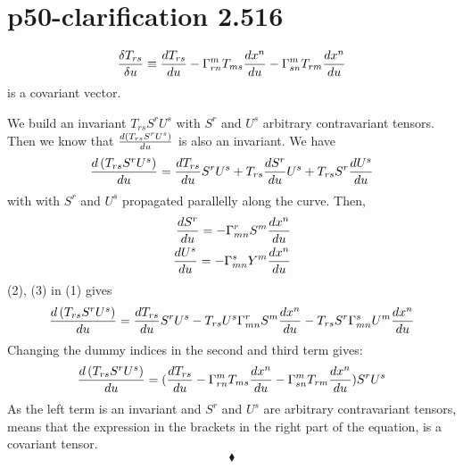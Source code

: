 \section{p50-clarification 2.516}
\begin{tcolorbox}
$$\frac{\delta T_{rs}}{\delta u} \equiv \dv{T_{rs}}{u}  - \Gamma^m_{rn}T_{ms}\dv{x^n}{u} - \Gamma^m_{sn}T_{rm}\dv{x^n}{u}$$ is a covariant vector.
\end{tcolorbox}
We build an invariant $ T_{rs} S^rU^s$ with $S^r$ and $U^s$ arbitrary contravariant tensors. Then we know that $\dv{\left( T_{rs} S^r U^s\right)}{u}$ is also an invariant. We have 
\begin{align}
\dv{\left( T_{rs} S^r U^s\right)}{u} = \dv{T_{rs}}{u} S^r U^s + T_{rs} \dv{S^r}{u} U^s + T_{rs} S^r \dv{U^s}{u}
\end{align} 
with with $S^r$ and $U^s$ propagated parallelly along the curve. Then,
\begin{align}
\dv{S^r}{u} = - \Gamma^r_{mn}S^m\dv{x^n}{u}\\
\dv{U^s}{u} = - \Gamma^s_{mn}Y^m\dv{x^n}{u}
\end{align} 
(2), (3) in (1) gives 
\begin{align}
\dv{\left( T_{rs} S^r U^s\right)}{u} = \dv{T_{rs}}{u} S^r U^s - T_{rs}U^s\Gamma^r_{mn}S^m\dv{x^n}{u} - T_{rs} S^r \Gamma^s_{mn}U^m\dv{x^n}{u}
\end{align} 
Changing the dummy indices in the second and third term gives:
\begin{align}
\dv{\left( T_{rs} S^r U^s\right)}{u} = (\dv{T_{rs}}{u}  - \Gamma^m_{rn}T_{ms}\dv{x^n}{u} - \Gamma^m_{sn}T_{rm}\dv{x^n}{u})S^r U^s
\end{align} 
As the left term is an invariant and $S^r$ and $U^s$ are arbitrary contravariant tensors, means that the expression in the brackets in the right part of the equation, is a covariant tensor.
$$\blacklozenge$$
\newpage

